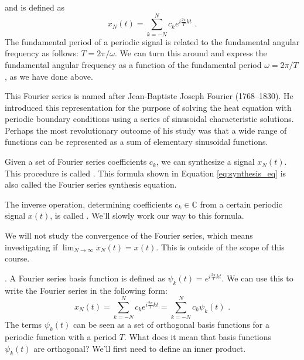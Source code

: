  and is defined as 
\begin{equation}
\boxed{
x_N(t) = \sum_{k=-N}^{N} c_k e^{i \frac{2\pi}{T} k t}
\label{eq:synthesis_eq}
} \,\,.
\end{equation}
The fundamental period of a periodic signal is related to the fundamental angular frequency as follows: $T=2\pi/\omega$. We can turn this around and express the fundamental angular frequency as a function of the fundamental period $\omega=2\pi/T$, as we have done above.



This Fourier series is named after Jean-Baptiste Joseph Fourier (1768–1830). He introduced this representation for the purpose of solving the heat equation with periodic boundary conditions using a series of sinusoidal characteristic solutions. Perhaps the most revolutionary outcome of his study was that a wide range of functions can be represented as a sum of elementary sinusoidal functions.

Given a set of Fourier series coefficients $c_k$, we can synthesize a signal $x_N(t)$. This procedure is called \emph{}. This formula shown in Equation \ref{eq:synthesis_eq} is also called the Fourier series synthesis equation.

The inverse operation, determining coefficients $c_k \in \mathbb{C}$ from a certain periodic signal $x(t)$, is called \emph{}. We'll slowly work our way to this formula.

We will not study the convergence of the Fourier series, which means investigating if $\lim_{N\rightarrow \infty} x_N(t) = x(t)$. This is outside of the scope of this course.

. A Fourier series basis function is defined as $\psi_k(t)=e^{i\frac{2\pi}{T} k t}$. We can use this to write the Fourier series in the following form:
\begin{equation}
x_N(t) = \sum_{k=-N}^{N} c_k e^{i \frac{2\pi}{T} k t} = \sum_{k=-N}^{N} c_k \psi_k(t) \,\,.
\end{equation}
The terms $\psi_k(t)$ can be seen as a set of orthogonal basis functions for a periodic function with a period $T$. What does it mean that basis functions $\psi_k(t)$ are orthogonal? We'll first need to define an inner product.


